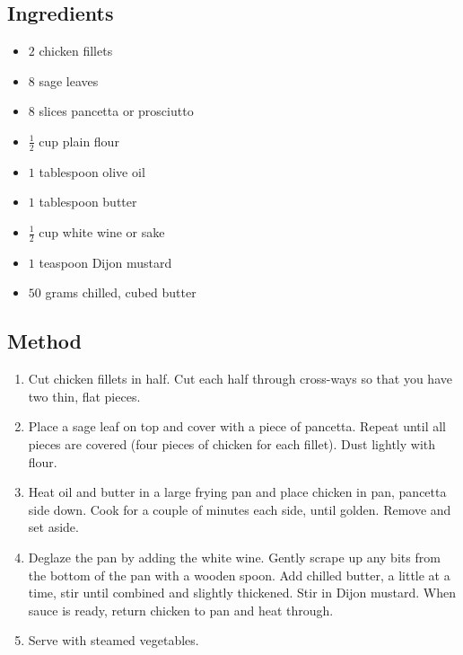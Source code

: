 \documentclass[11pt,a4paper]{article}
\begin{document}
\subsection*{Ingredients}

\begin{multicols}{2}

\begin{itemize}
   \item $ 2 $ chicken fillets
   \item $ 8 $ sage leaves
   \item $ 8 $ slices pancetta or prosciutto
   \item $ \frac {1} {2} $ cup plain flour
\end{itemize}

\columnbreak

\begin{itemize}
   \item $ 1 $ tablespoon olive oil
   \item $ 1 $ tablespoon butter
   \item $ \frac {1} {2} $ cup white wine or sake
   \item $ 1 $ teaspoon Dijon mustard
   \item $ 50 $ grams chilled, cubed butter
\end{itemize}

\end{multicols}

\medskip

\subsection*{Method}

\begin{enumerate}
   \item Cut chicken fillets in half. Cut each half through cross-ways so that you have two thin, flat pieces.
   \item Place a sage leaf on top and cover with a piece of pancetta. 
         Repeat until all pieces are covered (four pieces of chicken for each fillet). 
         Dust lightly with flour.
   \item Heat oil and butter in a large frying pan and place chicken in pan, pancetta side down.
         Cook for a couple of minutes each side, until golden.
         Remove and set aside.
   \item Deglaze the pan by adding the white wine. Gently scrape up any bits from the bottom of the pan with a wooden spoon.
         Add chilled butter, a little at a time, stir until combined and slightly thickened. Stir in Dijon mustard.
         When sauce is ready, return chicken to pan and heat through.
   \item Serve with steamed vegetables.
\end{enumerate}

\end{document}
